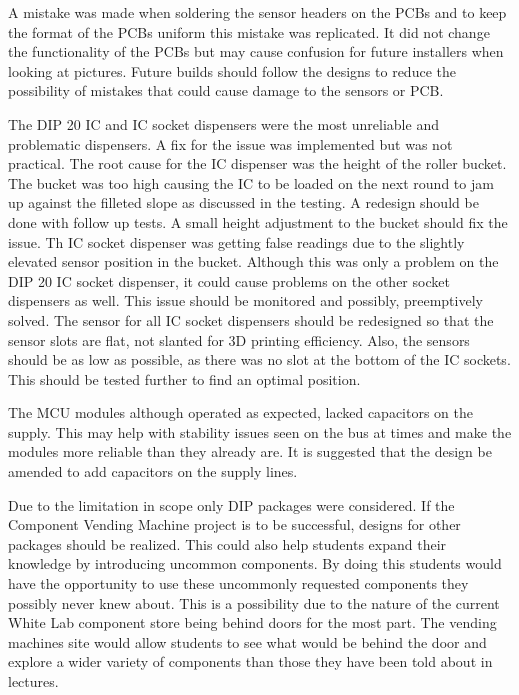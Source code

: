 \documentclass[a4paper,11pt]{article}
\numberwithin{figure}{section}
\numberwithin{table}{section}
\begin{document}
A mistake was made when soldering the sensor headers on the PCBs and to keep the format of the PCBs uniform this mistake was replicated. It did not change the functionality of the PCBs but may cause confusion for future installers when looking at pictures. Future builds should follow the designs to reduce the possibility of mistakes that could cause damage to the sensors or PCB.

The DIP 20 IC and IC socket dispensers were the most unreliable and problematic dispensers. A fix for the issue was implemented but was not practical. The root cause for the IC dispenser was the height of the roller bucket. The bucket was too high causing the IC to be loaded on the next round to jam up against the filleted slope as discussed in the testing. A redesign should be done with follow up tests. A small height adjustment to the bucket should fix the issue. Th IC socket dispenser was getting false readings due to the slightly elevated sensor position in the bucket. Although this was only a problem on the DIP 20 IC socket dispenser, it could cause problems on the other socket dispensers as well. This issue should be monitored and possibly, preemptively solved. The sensor for all IC socket dispensers should be redesigned so that the sensor slots are flat, not slanted for 3D printing efficiency. Also, the sensors should be as low as possible, as there was no slot at the bottom of the IC sockets. This should be tested further to find an optimal position.

The MCU modules although operated as expected, lacked capacitors on the supply. This may help with stability issues seen on the bus at times and make the modules more reliable than they already are. It is suggested that the design be amended to add capacitors on the supply lines.

Due to the limitation in scope only DIP packages were considered. If the Component Vending Machine project is to be successful, designs for other packages should be realized. This could also help students expand their knowledge by introducing uncommon components. By doing this students would have the opportunity to use these uncommonly requested components they possibly never knew about. This is a possibility due to the nature of the current White Lab component store being behind doors for the most part. The vending machines site would allow students to see what would be behind the door and explore a wider variety of components than those they have been told about in lectures.
\end{document}
